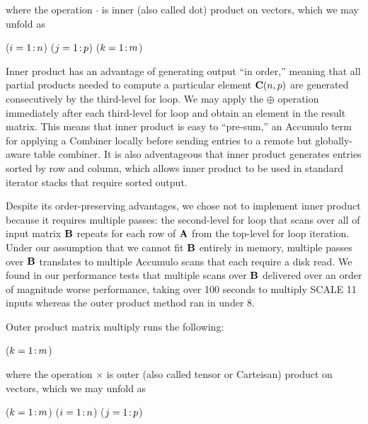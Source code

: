\noindent where the operation $\cdot$ is inner (also called dot) product on vectors, which we may unfold as
\begin{algorithm}[h]
\fore($i = 1\colon\! n$){
\fore($j = 1\colon\! p$){
\fore($k = 1\colon\! m$){
}}}
\end{algorithm}

Inner product has an advantage of generating output ``in order,'' meaning that all partial products needed 
to compute a particular element $\mathbf{C}(n,p)$ are generated consecutively by the third-level for loop.
We may apply the $\oplus$ operation immediately after each third-level for loop and obtain an element in the result matrix.
This means that inner product is easy to ``pre-sum,'' an Accumulo term for applying a Combiner
locally before sending entries to a remote but globally-aware table combiner.
It is also adventageous that inner product generates entries sorted by row 
and column, which allows inner product to be used in standard iterator stacks that require sorted output.

Despite its order-preserving advantages, we chose not to implement inner product 
because it requires multiple passes:
the second-level for loop that scans over all of input matrix $\mathbf{B}$
repeats for each row of $\mathbf{A}$ from the top-level for loop iteration.
Under our assumption that we cannot fit $\mathbf{B}$ entirely in memory,
multiple passes over $\mathbf{B}$ translates to multiple Accumulo scans that each require a disk read.
We found in our performance tests that multiple scans over $\mathbf{B}$ 
delivered over an order of magnitude worse performance, taking over 100 seconds to multiply SCALE 11 inputs
whereas the outer product method ran in under 8.

Outer product matrix multiply runs the following:
\begin{algorithm}
\fore($k = 1\colon\! m$){
}
\end{algorithm}

\noindent where the operation $\times$ is outer (also called tensor or Carteisan) product on vectors, which we may unfold as
\begin{algorithm}
\fore($k = 1\colon\! m$){
\fore($i = 1\colon\! n$){
\fore($j = 1\colon\! p$){
}}}
\end{algorithm}

